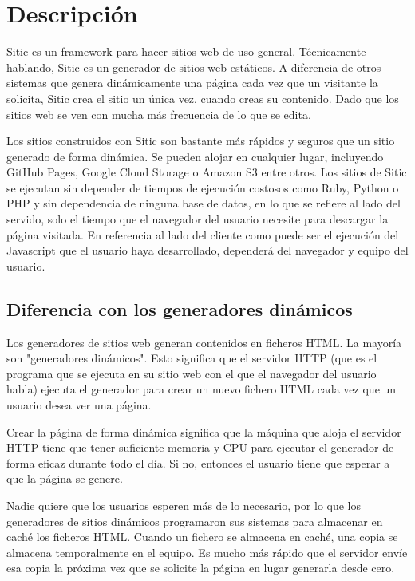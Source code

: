 \section{Descripción}

Sitic es un framework para hacer sitios web de uso general. Técnicamente hablando, Sitic es un generador de sitios web estáticos.
A diferencia de otros sistemas que genera dinámicamente una página cada vez que un visitante la solicita, Sitic crea el sitio
un única vez, 
cuando creas su contenido. Dado que los sitios web se ven con mucha más frecuencia de lo que se edita.

Los sitios construidos con Sitic son bastante más rápidos y seguros que un sitio generado de forma dinámica.
Se pueden alojar en cualquier lugar, incluyendo GitHub Pages, Google Cloud Storage o Amazon
S3 entre otros. Los sitios de Sitic se ejecutan sin depender de tiempos de ejecución costosos como Ruby, Python
o PHP y sin dependencia de ninguna base de datos, en lo que se refiere al lado del servido, solo el tiempo
que el navegador del usuario necesite para descargar la página visitada. En referencia al lado
del cliente como puede ser el ejecución del Javascript que el usuario haya desarrollado, dependerá del navegador y
equipo del usuario.

\subsection{Diferencia con los generadores dinámicos}

Los generadores de sitios web generan contenidos en ficheros HTML. La mayoría son "generadores dinámicos".
Esto significa que el servidor HTTP (que es el programa que se ejecuta en su sitio web con el que el navegador del
usuario habla) ejecuta el generador para crear un nuevo fichero HTML cada vez que un usuario desea ver una página.

Crear la página de forma dinámica significa que la máquina que aloja el servidor HTTP tiene que tener suficiente
memoria y CPU para ejecutar el generador de forma eficaz durante todo el día. Si no, entonces el usuario tiene que
esperar a que la página se genere.

Nadie quiere que los usuarios esperen más de lo necesario, por lo que los generadores de sitios dinámicos programaron
sus sistemas para almacenar en caché los ficheros HTML. Cuando un fichero se almacena en caché, una copia se
almacena temporalmente en el equipo. Es mucho más rápido que el servidor envíe esa copia la próxima vez que
se solicite la página en lugar generarla desde cero.

